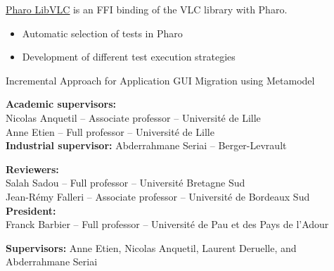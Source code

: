 \documentclass[10pt,a4paper,ragged2e,withhyper]{altacv}
\begin{document}
\href{https://github.com/badetitou/Pharo-LibVLC}
{\color{blue}\underline{Pharo LibVLC}} is an FFI binding of the VLC library with Pharo.


\divider

\begin{itemize}
  \item Automatic selection of tests in Pharo
  \item Development of different test execution strategies
\end{itemize}



\divider


\divider



Incremental Approach for Application GUI Migration using Metamodel


\textbf{Academic supervisors:}\\
Nicolas Anquetil -- Associate professor -- Université de Lille\\
Anne Etien -- Full professor -- Université de Lille\\
\textbf{Industrial supervisor:} Abderrahmane Seriai -- Berger-Levrault


\textbf{Reviewers:}\\
Salah Sadou -- Full professor -- Université Bretagne Sud\\
Jean-Rémy Falleri -- Associate professor -- Université de Bordeaux Sud\\

\textbf{President:}\\
Franck Barbier -- Full professor -- Université de Pau et des Pays de l’Adour


\divider


\textbf{Supervisors:} Anne Etien, Nicolas Anquetil, Laurent Deruelle, and Abderrahmane Seriai
\end{document}
